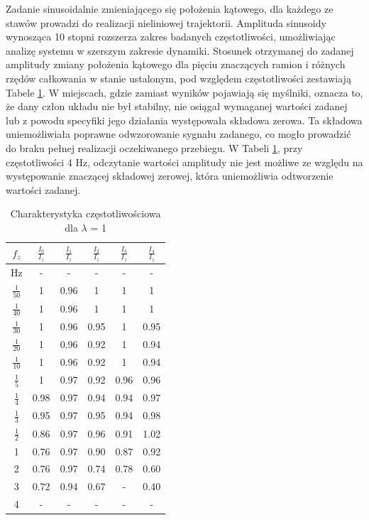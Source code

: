 \documentclass[journal,twoside,web]{ieeecolor}
\begin{document}
Zadanie sinusoidalnie zmieniającego się położenia kątowego, dla każdego ze stawów prowadzi do realizacji nieliniowej trajektorii. Amplituda sinusoidy wynosząca 10 stopni rozszerza zakres badanych częstotliwości, umożliwiając analizę systemu w szerszym zakresie dynamiki. Stosunek otrzymanej do zadanej amplitudy zmiany położenia kątowego dla pięciu znaczących ramion i różnych rzędów całkowania w stanie ustalonym, pod względem częstotliwości zestawiają Tabele \ref{tab:lam1}.
W miejscach, gdzie zamiast wyników pojawiają się myślniki, oznacza to, że dany człon układu nie był stabilny, nie osiągał wymaganej wartości zadanej lub z powodu specyfiki jego działania występowała składowa zerowa. Ta składowa uniemożliwiała poprawne odwzorowanie sygnału zadanego, co mogło prowadzić do braku pełnej realizacji oczekiwanego przebiegu. W Tabeli \ref{tab:lam1}, przy częstotliwości 4 Hz, odczytanie wartości amplitudy nie jest możliwe ze względu na występowanie znaczącej składowej zerowej, która uniemożliwia odtworzenie wartości zadanej. 
\begin{table}[h]
	\centering
	\caption{Charakterystyka częstotliwościowa dla $\lambda$ = 1}
	\label{tab:lam1} %
	\begin{tabular}{|c|c|c|c|c|c|}
		\hline
		$f_z$ & $\frac{I_{0}}{I_z}$ & $\frac{I_{1}}{I_z}$ & $\frac{I_{2}}{I_z}$ & $\frac{I_{3}}{I_z}$ & $\frac{I_{4}}{I_z}$ \\
		\hline
		Hz & - & - & - & - & - \\
		\hline
		$\frac{1}{50}$ & 1 & 0.96 & 1 & 1 & 1 \\
		\hline
		$\frac{1}{40}$ & 1 & 0.96 & 1 & 1 & 1 \\
		\hline
		$\frac{1}{30}$ & 1 & 0.96 & 0.95 & 1 & 0.95 \\
		\hline
		$\frac{1}{20}$ & 1 & 0.96 & 0.92 & 1 & 0.94 \\
		\hline
		$\frac{1}{10}$ & 1 & 0.96 & 0.92 & 1 & 0.94 \\
		\hline
		$\frac{1}{5}$ & 1 & 0.97 & 0.92 & 0.96 & 0.96 \\
		\hline
		$\frac{1}{4}$ & 0.98 & 0.97 & 0.94 & 0.94 & 0.97 \\
		\hline
		$\frac{1}{3}$ & 0.95 & 0.97 & 0.95 & 0.94 & 0.98 \\
		\hline
		$\frac{1}{2}$ & 0.86 & 0.97 & 0.96 & 0.91 & 1.02 \\
		\hline
		1 & 0.76 & 0.97 & 0.90 & 0.87 & 0.92 \\
		\hline
		2 & 0.76 & 0.97 & 0.74 & 0.78 & 0.60 \\
		\hline
		3 & 0.72 & 0.94 & 0.67 & - & 0.40 \\
		\hline
		4 & - & - & - & - & - \\
		\hline
	\end{tabular}
\end{table}
\end{document}
